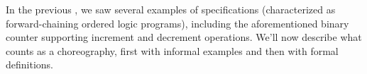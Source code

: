 \documentclass[
  class=../hdeyoung-proposal,
  crop=false
]{standalone}
\begin{document}
In the previous , we saw several examples of specifications (characterized as forward-chaining ordered logic programs), including the aforementioned binary counter supporting increment and decrement operations.
We'll now describe what counts as a choreography, first with informal examples and then with formal definitions.





\end{document}
